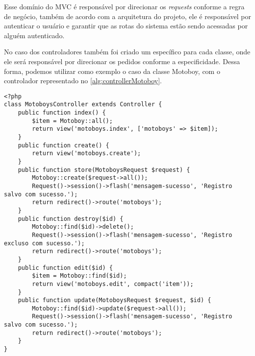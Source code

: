 Esse domínio do MVC é responsável por direcionar os \textit{requests} conforme a regra de negócio, também de acordo com a arquitetura do projeto, ele é responsável por autenticar o usuário e garantir que as rotas do sistema estão sendo acessadas por alguém autenticado. 

No caso dos controladores também foi criado um específico para cada classe, onde ele será responsável por direcionar os pedidos conforme a especificidade. Dessa forma, podemos utilizar como exemplo o caso da classe Motoboy, com o controlador representado no \autoref{alg:controllerMotoboy}.

\begin{lstlisting}[caption={Delivery Routes - Exemplo de um Controller: Motoboy}, style=htmlcssjs, label=alg:controllerMotoboy]
<?php
class MotoboysController extends Controller {
    public function index() {
        $item = Motoboy::all();
        return view('motoboys.index', ['motoboys' => $item]);
    }
    public function create() {
        return view('motoboys.create');
    }
    public function store(MotoboysRequest $request) {
        Motoboy::create($request->all());
        Request()->session()->flash('mensagem-sucesso', 'Registro salvo com sucesso.');
        return redirect()->route('motoboys');
    }
    public function destroy($id) {
        Motoboy::find($id)->delete();
        Request()->session()->flash('mensagem-sucesso', 'Registro excluso com sucesso.');
        return redirect()->route('motoboys');
    }
    public function edit($id) {
        $item = Motoboy::find($id);
        return view('motoboys.edit', compact('item'));
    }
    public function update(MotoboysRequest $request, $id) {
        Motoboy::find($id)->update($request->all());
        Request()->session()->flash('mensagem-sucesso', 'Registro salvo com sucesso.');
        return redirect()->route('motoboys');
    }
}
\end{lstlisting}

